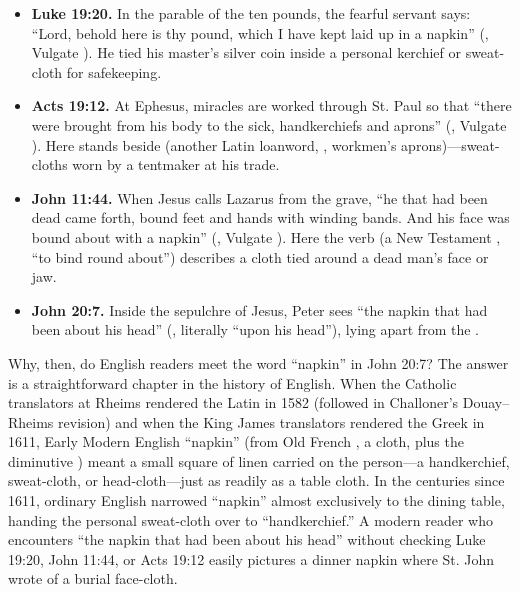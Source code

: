 \begin{itemize}
\item \textbf{Luke 19:20.} In the parable of the ten pounds, the fearful servant says: ``Lord, behold here is thy pound, which I have kept laid up in a napkin'' (, Vulgate ). He tied his master's silver coin inside a personal kerchief or sweat-cloth for safekeeping.
\item \textbf{Acts 19:12.} At Ephesus, miracles are worked through St. Paul so that ``there were brought from his body to the sick, handkerchiefs and aprons'' (, Vulgate ). Here  stands beside  (another Latin loanword, , workmen's aprons)---sweat-cloths worn by a tentmaker at his trade.
\item \textbf{John 11:44.} When Jesus calls Lazarus from the grave, ``he that had been dead came forth, bound feet and hands with winding bands. And his face was bound about with a napkin'' (, Vulgate ). Here the verb  (a New Testament , ``to bind round about'') describes a cloth tied around a dead man's face or jaw.
\item \textbf{John 20:7.} Inside the sepulchre of Jesus, Peter sees ``the napkin that had been about his head'' (, literally ``upon his head''), lying apart from the .
\end{itemize}

Why, then, do English readers meet the word ``napkin'' in John 20:7? The answer is a straightforward chapter in the history of English. When the Catholic translators at Rheims rendered the Latin  in 1582 (followed in Challoner's Douay--Rheims revision) and when the King James translators rendered the Greek  in 1611, Early Modern English ``napkin'' (from Old French , a cloth, plus the diminutive ) meant a small square of linen carried on the person---a handkerchief, sweat-cloth, or head-cloth---just as readily as a table cloth. In the centuries since 1611, ordinary English narrowed ``napkin'' almost exclusively to the dining table, handing the personal sweat-cloth over to ``handkerchief.'' A modern reader who encounters ``the napkin that had been about his head'' without checking Luke 19:20, John 11:44, or Acts 19:12 easily pictures a dinner napkin where St. John wrote of a burial face-cloth.

